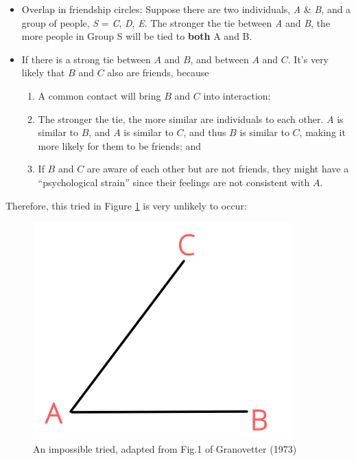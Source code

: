 \documentclass[
]{krantz}
\providecommand{\tightlist}{%
  \setlength{\itemsep}{0pt}\setlength{\parskip}{0pt}}
\begin{document}
\begin{itemize}
\item
  Overlap in friendship circles: Suppose there are two individuals, \emph{A} \& \emph{B}, and a group of people, \emph{S} = \emph{C}, \emph{D}, \emph{E}. The stronger the tie between \emph{A} and \emph{B}, the more people in Group S will be tied to \textbf{both} A and B.
\item
  If there is a strong tie between \(A\) and \(B\), and between \(A\) and \(C\). It's very likely that \(B\) and \(C\) also are friends, because

  \begin{enumerate}
  \def\labelenumi{\arabic{enumi}.}
  \tightlist
  \item
    A common contact will bring \(B\) and \(C\) into interaction;
  \item
    The stronger the tie, the more similar are individuals to each other. \(A\) is similar to \(B\), and \(A\) is similar to \(C\), and thus \(B\) is similar to \(C\), making it more likely for them to be friends; and
  \item
    If \(B\) and \(C\) are aware of each other but are not friends, they might have a ``psychological strain'' since their feelings are not consistent with \(A\).
  \end{enumerate}
\end{itemize}

Therefore, this tried in Figure \ref{fig:tried} is very unlikely to occur:

\begin{figure}

{\centering \includegraphics[width=0.45\linewidth]{images/tried} 

}

\caption{An impossible tried, adapted from Fig.1 of Granovetter (1973)}\label{fig:tried}
\end{figure}
\end{document}
